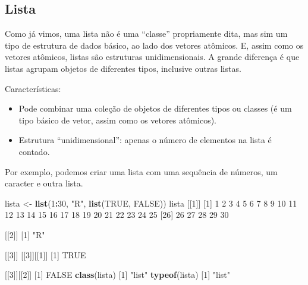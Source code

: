 \documentclass[10pt,a4paper]{book}
\newenvironment{Shaded}{\begin{snugshade}}{\end{snugshade}}
\newcommand{\KeywordTok}[1]{\textcolor[rgb]{0.13,0.29,0.53}{\textbf{#1}}}
\newcommand{\DecValTok}[1]{\textcolor[rgb]{0.00,0.00,0.81}{#1}}
\newcommand{\StringTok}[1]{\textcolor[rgb]{0.31,0.60,0.02}{#1}}
\newcommand{\OtherTok}[1]{\textcolor[rgb]{0.56,0.35,0.01}{#1}}
\newcommand{\OperatorTok}[1]{\textcolor[rgb]{0.81,0.36,0.00}{\textbf{#1}}}
\newcommand{\NormalTok}[1]{#1}
\providecommand{\tightlist}{%
  \setlength{\itemsep}{0pt}\setlength{\parskip}{0pt}}
\begin{document}
\subsection{Lista}\label{lista}

Como já vimos, uma lista não é uma ``classe'' propriamente dita, mas sim
um tipo de estrutura de dados básico, ao lado dos vetores atômicos. E,
assim como os vetores atômicos, listas são estruturas unidimensionais. A
grande diferença é que listas agrupam objetos de diferentes tipos,
inclusive outras listas.

Características:

\begin{itemize}
\tightlist
\item
  Pode combinar uma coleção de objetos de diferentes tipos ou classes (é
  um tipo básico de vetor, assim como os vetores atômicos).
\item
  Estrutura ``unidimensional'': apenas o número de elementos na lista é
  contado.
\end{itemize}

Por exemplo, podemos criar uma lista com uma sequência de números, um
caracter e outra lista.

\begin{Shaded}
\begin{Highlighting}[]
\NormalTok{lista <-}\StringTok{ }\KeywordTok{list}\NormalTok{(}\DecValTok{1}\OperatorTok{:}\DecValTok{30}\NormalTok{, }\StringTok{"R"}\NormalTok{, }\KeywordTok{list}\NormalTok{(}\OtherTok{TRUE}\NormalTok{, }\OtherTok{FALSE}\NormalTok{))}
\NormalTok{lista}
\NormalTok{[[}\DecValTok{1}\NormalTok{]]}
\NormalTok{ [}\DecValTok{1}\NormalTok{]  }\DecValTok{1}  \DecValTok{2}  \DecValTok{3}  \DecValTok{4}  \DecValTok{5}  \DecValTok{6}  \DecValTok{7}  \DecValTok{8}  \DecValTok{9} \DecValTok{10} \DecValTok{11} \DecValTok{12} \DecValTok{13} \DecValTok{14} \DecValTok{15} \DecValTok{16} \DecValTok{17} \DecValTok{18} \DecValTok{19} \DecValTok{20} \DecValTok{21} \DecValTok{22} \DecValTok{23} \DecValTok{24} \DecValTok{25}
\NormalTok{[}\DecValTok{26}\NormalTok{] }\DecValTok{26} \DecValTok{27} \DecValTok{28} \DecValTok{29} \DecValTok{30}

\NormalTok{[[}\DecValTok{2}\NormalTok{]]}
\NormalTok{[}\DecValTok{1}\NormalTok{] }\StringTok{"R"}

\NormalTok{[[}\DecValTok{3}\NormalTok{]]}
\NormalTok{[[}\DecValTok{3}\NormalTok{]][[}\DecValTok{1}\NormalTok{]]}
\NormalTok{[}\DecValTok{1}\NormalTok{] }\OtherTok{TRUE}

\NormalTok{[[}\DecValTok{3}\NormalTok{]][[}\DecValTok{2}\NormalTok{]]}
\NormalTok{[}\DecValTok{1}\NormalTok{] }\OtherTok{FALSE}
\KeywordTok{class}\NormalTok{(lista)}
\NormalTok{[}\DecValTok{1}\NormalTok{] }\StringTok{"list"}
\KeywordTok{typeof}\NormalTok{(lista)}
\NormalTok{[}\DecValTok{1}\NormalTok{] }\StringTok{"list"}
\end{Highlighting}
\end{Shaded}
\end{document}
